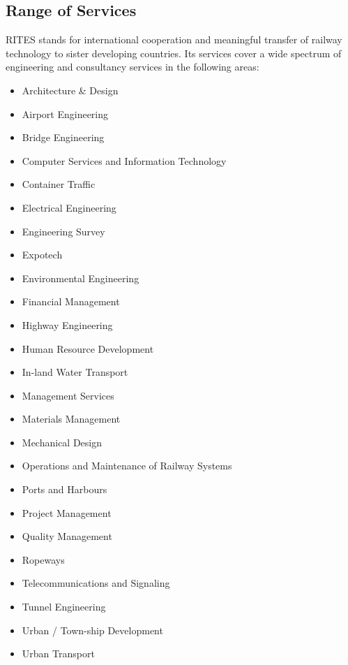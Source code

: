 \bigskip


\subsection{Range of Services}


\bigskip

{\color[rgb]{0.0,0.0,0.039215688}
RITES stands for international cooperation and meaningful transfer of railway technology to sister developing countries.
Its services cover a wide spectrum of engineering and consultancy services in the following areas: }

\begin{itemize}
\item {\color[rgb]{0.0,0.0,0.039215688}
Architecture \& Design}
\item {\color[rgb]{0.0,0.0,0.039215688}
Airport Engineering}
\item {\color[rgb]{0.0,0.0,0.039215688}
Bridge Engineering\ \ \ \ }
\item {\color[rgb]{0.0,0.0,0.039215688}
Computer Services and Information Technology}
\item {\color[rgb]{0.0,0.0,0.039215688}
Container Traffic}
\item {\color[rgb]{0.0,0.0,0.039215688}
Electrical Engineering}
\item {\color[rgb]{0.0,0.0,0.039215688}
Engineering Survey}
\item {\color[rgb]{0.0,0.0,0.039215688}
Expotech}
\item {\color[rgb]{0.0,0.0,0.039215688}
Environmental Engineering}
\item {\color[rgb]{0.0,0.0,0.039215688}
Financial Management}
\item {\color[rgb]{0.0,0.0,0.039215688}
Highway Engineering}
\item {\color[rgb]{0.0,0.0,0.039215688}
Human Resource Development}
\item {\color[rgb]{0.0,0.0,0.039215688}
In-land Water Transport}
\item {\color[rgb]{0.0,0.0,0.039215688}
Management Services}
\item {\color[rgb]{0.0,0.0,0.039215688}
Materials Management}
\item {\color[rgb]{0.0,0.0,0.039215688}
Mechanical Design}
\item {\color[rgb]{0.0,0.0,0.039215688}
Operations and Maintenance of Railway Systems}
\item {\color[rgb]{0.0,0.0,0.039215688}
Ports and Harbours}
\item {\color[rgb]{0.0,0.0,0.039215688}
Project Management}
\item {\color[rgb]{0.0,0.0,0.039215688}
Quality Management}
\item {\color[rgb]{0.0,0.0,0.039215688}
Ropeways}
\item {\color[rgb]{0.0,0.0,0.039215688}
Telecommunications and Signaling}
\item {\color[rgb]{0.0,0.0,0.039215688}
Tunnel Engineering}
\item {\color[rgb]{0.0,0.0,0.039215688}
Urban / Town-ship Development}
\item {\color[rgb]{0.0,0.0,0.039215688}
Urban Transport}
\end{itemize}

